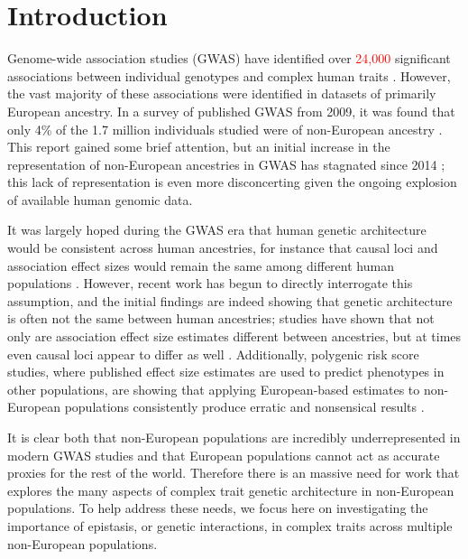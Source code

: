\documentclass[12pt,a4paper]{article}
\begin{document}
\linenumbers

\section{Introduction}\label{InterPath-Introduction}

Genome-wide association studies (GWAS) have identified over \textcolor{red}{24,000} significant associations between individual genotypes and complex human traits \citep{Buniello2019}. However, the vast majority of these associations were identified in datasets of primarily European ancestry. In a survey of published GWAS from 2009, it was found that only 4\% of the 1.7 million individuals studied were of non-European ancestry \citep{Need2009}. This report gained some brief attention, but an initial increase in the representation of non-European ancestries in GWAS has stagnated since 2014 \citep{Popejoy2016,Martin2019}; this lack of representation is even more disconcerting given the ongoing explosion of available human genomic data. 

It was largely hoped during the GWAS era that human genetic architecture would be consistent across human ancestries, for instance that causal loci and association effect sizes would remain the same among different human populations \citep{Need2009,Pulit2010,Bustamante2011,Bien2019}. However, recent work has begun to directly interrogate this assumption, and the initial findings are indeed showing that genetic architecture is often not the same between human ancestries; studies have shown that not only are association effect size estimates different between ancestries, but at times even causal loci appear to differ as well \citep{Dumitrescu2011,Carlson2013,Kuchenbaecker2019,Wojcik2019}. Additionally, polygenic risk score studies, where published effect size estimates are used to predict phenotypes in other populations, are showing that applying European-based estimates to non-European populations consistently produce erratic and nonsensical results \citep{Martin2017,Duncan2019,Kerminen2019,Rosenberg2019}.

It is clear both that non-European populations are incredibly underrepresented in modern GWAS studies and that European populations cannot act as accurate proxies for the rest of the world. Therefore there is an massive need for work that explores the many aspects of complex trait genetic architecture in non-European populations. To help address these needs, we focus here on investigating the importance of epistasis, or genetic interactions, in complex traits across multiple non-European populations. 
\end{document}
